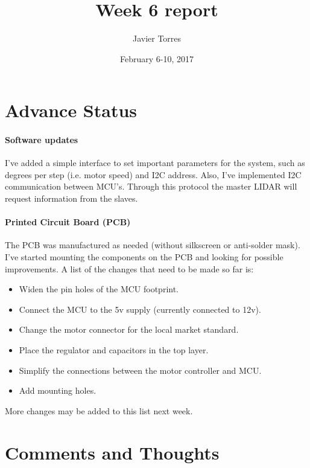 \documentclass{article}
\title{Week 6 report}
\author{Javier Torres}
\date{February 6-10, 2017}
\begin{document}
\maketitle

\tableofcontents

\section{Advance Status}

\paragraph{Software updates}
I've added a simple interface to set important parameters for the system, such as degrees per step (i.e. motor speed) and I2C address. Also, I've implemented I2C communication between MCU's. Through this protocol the master LIDAR will request information from the slaves.

\paragraph{Printed Circuit Board (PCB)}
The PCB was manufactured as needed (without silkscreen or anti-solder mask). I've started mounting the components on the PCB and looking for possible improvements. A list of the changes that need to be made so far is:
\begin{itemize}
    \item Widen the pin holes of the MCU footprint.
    \item Connect the MCU to the 5v supply (currently connected to 12v).
    \item Change the motor connector for the local market standard.
    \item Place the regulator and capacitors in the top layer.
    \item Simplify the connections between the motor controller and MCU.
    \item Add mounting holes.
\end{itemize}
More changes may be added to this list next week.

\section{Comments and Thoughts}
\end{document}
